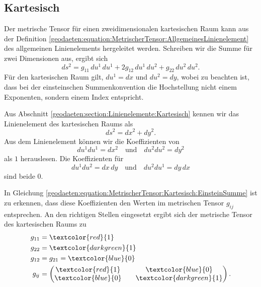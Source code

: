 %
%
%
%
\subsection{Kartesisch\label{geodaeten:section:MetrischerTensor:Kartesisch}}

Der metrische Tensor für einen zweidimensionalen kartesischen Raum kann aus der Definition \eqref{geodaeten:equation:MetrischerTensor:AllgemeinesLinienelement} des allgemeinen Linienelements hergeleitet werden.
Schreiben wir die Summe für zwei Dimensionen aus, ergibt sich
\begin{equation}
	ds^2 = g_{11} \, du^1 \, du^1 + 2g_{12} \, du^1 \, du^2 + g_{22} \, du^2 \, du^2.
	\label{geodaeten:equation:MetrischerTensor:Kartesisch:EinsteinSumme}
\end{equation}
Für den kartesischen Raum gilt, $du^1 = dx$ und $du^2 = dy$, wobei zu beachten ist, dass bei der einsteinschen Summenkonvention die Hochstellung nicht einem Exponenten, sondern einem Index entspricht.

Aus Abschnitt \ref{geodaeten:section:Linienelemente:Kartesisch} kennen wir das Linienelement des kartesischen Raums als
\begin{equation}
	ds^2 = dx^2 + dy^2 .
\end{equation}
Aus dem Linienelement können wir die Koeffizienten von 
\begin{equation}
	du^1 du^1 = dx^2 \quad \text{und} \quad du^2  du^2 = dy^2 
\end{equation}
als $1$ herauslesen. 
Die Koeffizienten für
\begin{equation}
du^1  du^2 = dx \, dy \quad \text{und} \quad du^2  du^1 = dy \,  dx
\end{equation}
sind beide $0$.

In Gleichung \eqref{geodaeten:equation:MetrischerTensor:Kartesisch:EinsteinSumme} ist zu erkennen, dass diese Koeffizienten den Werten im metrischen Tensor $g_{i\!j}$ entsprechen.
An den richtigen Stellen eingesetzt ergibt sich der metrische Tensor des kartesischen Raums zu
\begin{equation}
	\begin{aligned}
		g_{11} &= \textcolor{red}{1} \\
		g_{22} &= \textcolor{darkgreen}{1} \\
		g_{12} &= g_{21} = \textcolor{blue}{0} \\
		g_{i\!j} &= \begin{pmatrix} \textcolor{red}{1} && \textcolor{blue}{0} \\ \textcolor{blue}{0} && \textcolor{darkgreen}{1} \end{pmatrix} .
	\end{aligned}
\end{equation}
